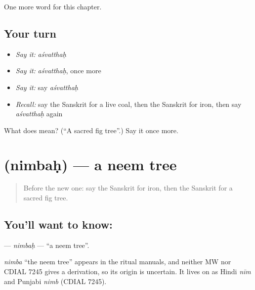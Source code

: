 \begin{grammarlens}[title={What you've built}]
One more word for this chapter.
\end{grammarlens}

\subsection*{Your turn}
\begin{itemize}
\raggedright
  \item \emph{Say it:} \emph{aśvatthaḥ}
  \item \emph{Say it:} \emph{aśvatthaḥ}, once more
  \item \emph{Say it:} say \emph{aśvatthaḥ}
  \item \emph{Recall:} say the Sanskrit for a live coal, then the Sanskrit for iron, then say \emph{aśvatthaḥ} again
\end{itemize}

\begin{tcolorbox}[breakable,colback=teal!4,colframe=teal!35!black,title={Before you move on}]
What does  mean? (\textquotedblleft{}A sacred fig tree\textquotedblright{}.) Say it once more.
\end{tcolorbox}
\section[\texorpdfstring{\sk{निम्बः} (nimbaḥ)}{निम्बः (nimbaḥ)}]{ (nimbaḥ) — a neem tree}

\label{lesson:SA-C166-nimbah}



\begin{quote}
Before the new one: say the Sanskrit for iron, then the Sanskrit for a sacred fig tree.
\end{quote}

\subsection*{You'll want to know: }
\textbf{} — \emph{nimbaḥ} — \textquotedblleft{}a neem tree\textquotedblright{}.

\begin{cousinweb}
\emph{nimba} \textquotedblleft{}the neem tree\textquotedblright{} appears in the ritual manuals, and neither MW nor CDIAL 7245 gives a derivation, so its origin is uncertain. It lives on as Hindi \emph{nīm} and Punjabi \emph{nimb} (CDIAL 7245).
\end{cousinweb}

